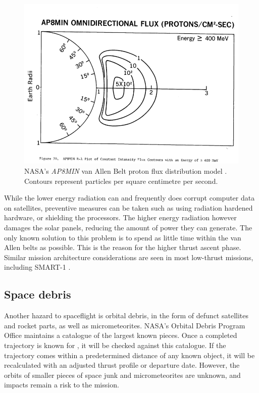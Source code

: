 \begin{figure} 
\includegraphics[width=\textwidth,clip,trim=0 35 0 67]{Images/800px-Ap8-omni-400_0MeV.png}
\caption{NASA's \emph{AP8MIN} van Allen Belt proton flux distribution model \parencite{Sawyer1976}. Contours represent particles per square centimetre per second.} \label{fig:vabs3}
\end{figure}

While the lower energy radiation can and frequently does corrupt computer data on satellites, preventive measures can be taken such as using radiation hardened hardware, or shielding the processors. The higher energy radiation however damages the solar panels, reducing the amount of power they can generate. The only known solution to this problem is to spend as little time within the van Allen belts as possible. This is the reason for the higher thrust ascent phase. Similar mission architecture considerations are seen in most low-thrust missions, including SMART-1 \parencite{Racca2002}.

\subsection{Space debris} \label{sub:Debris}

Another hazard to spaceflight is orbital debris, in the form of defunct satellites and rocket parts, as well as micrometeorites. NASA's Orbital Debris Program Office maintains a catalogue of the largest known pieces. Once a completed trajectory is known for \BW, it will be checked against this catalogue. If the trajectory comes within a predetermined distance of any known object, it will be recalculated with an adjusted thrust profile or departure date. However, the orbits of smaller pieces of space junk and micrometeorites are unknown, and impacts remain a risk to the mission.




